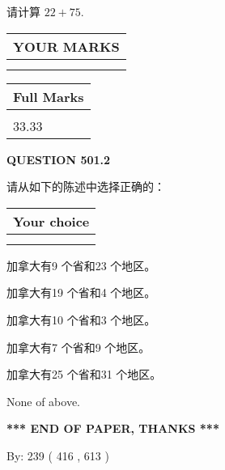 \documentclass{ctexart}
\begin{document}
  
 
请计算 $ %
22 +  %
75 $.
 

 

 
  
\vspace{0.2in}
  
\noindent\begin{tabular}{|l|}
\hline
 YOUR MARKS  \\
\hline
 \\ 
 \\ 
\hline
\end{tabular}
\hspace{0.05in} \begin{tabular}{|l|}
\hline
 Full Marks  \\
\hline
 \\ 
33.33 \\
\hline
\end{tabular}
{\textbf{\Large{QUESTION
501.2 
}}}
  
  
请从如下的陈述中选择正确的：
  
  
\noindent\hspace{3.0in} \begin{tabular}{|l|}
\hline
Your choice \\
\hline
 \\ 
 \\ 
\hline
\end{tabular}
  
  
 
 
加拿大有9 个省和23 个地区。
 
 
加拿大有19 个省和4 个地区。
 
 
加拿大有10 个省和3 个地区。
 
 
加拿大有7 个省和9 个地区。
 
 
加拿大有25 个省和31 个地区。
 
 
 None of above.
 
 
   
   
 \vspace{0.2in}
 
   
   
   
   
\vspace{1.0in} 
{\textbf{\large{ *** END OF PAPER, THANKS *** }}} 
   
   
\hspace{1.0in} By: 
 239 ( 416 ,  613 )
   
\end{document}
